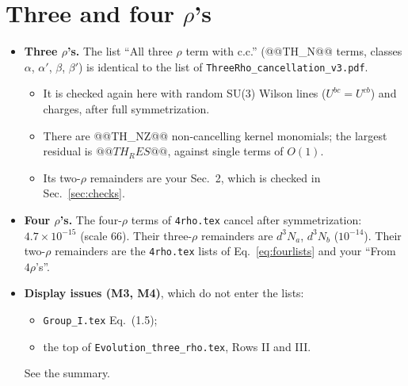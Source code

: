 \documentclass[10pt]{article}
\numberwithin{equation}{section}
\begin{document}
\section{Three and four $\rho$'s}\label{sec:three}
\begin{itemize}
\item \textbf{Three $\rho$'s.} The list ``All three $\rho$ term with c.c.'' (@@TH_N@@ terms, classes $\alpha$, $\alpha'$, $\beta$, $\beta'$) is identical to the list of \texttt{ThreeRho\_cancellation\_v3.pdf}.
\begin{itemize}
\item It is checked again here with random SU(3) Wilson lines ($U^{bc}=U^{cb}$) and charges, after full symmetrization.
\item There are @@TH_NZ@@ non-cancelling kernel monomials; the largest residual is $@@TH_RES@@$, against single terms of $O(1)$.
\item Its two-$\rho$ remainders are your Sec.~2, which is checked in Sec.~\ref{sec:checks}.
\end{itemize}
\item \textbf{Four $\rho$'s.} The four-$\rho$ terms of \texttt{4rho.tex} cancel after symmetrization: $4.7\times10^{-15}$ (scale 66). Their three-$\rho$ remainders are $d^3N_a$, $d^3N_b$ ($10^{-14}$). Their two-$\rho$ remainders are the \texttt{4rho.tex} lists of Eq.~\eqref{eq:fourlists} and your ``From $4\rho$'s''.
\item \textbf{Display issues (M3, M4)}, which do not enter the lists:
\begin{itemize}
\item \texttt{Group\_I.tex} Eq.~(1.5);
\item the top of \texttt{Evolution\_three\_rho.tex}, Rows II and III.
\end{itemize}
See the summary.
\end{itemize}

\end{document}

